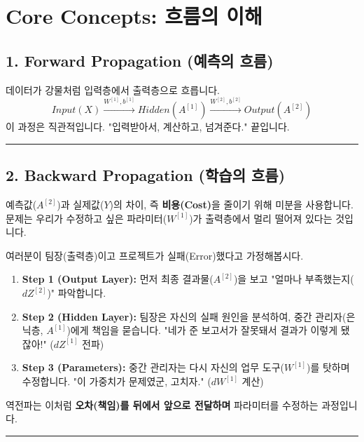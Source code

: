 \documentclass[11pt,a4paper]{book}
\theoremstyle{definition}
\begin{document}
\section{Core Concepts: 흐름의 이해}

\subsection{1. Forward Propagation (예측의 흐름)}


데이터가 강물처럼 입력층에서 출력층으로 흐릅니다.
$$ Input(X) \xrightarrow{W^{[1]}, b^{[1]}} Hidden(A^{[1]}) \xrightarrow{W^{[2]}, b^{[2]}} Output(A^{[2]}) $$
이 과정은 직관적입니다. "입력받아서, 계산하고, 넘겨준다." 끝입니다.

\vspace{0.5cm}\hrule\vspace{0.5cm}

\subsection{2. Backward Propagation (학습의 흐름)}


예측값($A^{[2]}$)과 실제값($Y$)의 차이, 즉 \textbf{비용(Cost)}을 줄이기 위해 미분을 사용합니다.
문제는 우리가 수정하고 싶은 파라미터($W^{[1]}$)가 출력층에서 멀리 떨어져 있다는 것입니다.

\begin{analogybox}[title={프로젝트 실패의 책임 소재 따지기 (The Blame Game)}]
여러분이 팀장(출력층)이고 프로젝트가 실패(Error)했다고 가정해봅시다.
\begin{enumerate}
    \item \textbf{Step 1 (Output Layer):} 먼저 최종 결과물($A^{[2]}$)을 보고 "얼마나 부족했는지($dZ^{[2]}$)" 파악합니다.
    \item \textbf{Step 2 (Hidden Layer):} 팀장은 자신의 실패 원인을 분석하여, 중간 관리자(은닉층, $A^{[1]}$)에게 책임을 묻습니다. "네가 준 보고서가 잘못돼서 결과가 이렇게 됐잖아!" ($dZ^{[1]}$ 전파)
    \item \textbf{Step 3 (Parameters):} 중간 관리자는 다시 자신의 업무 도구($W^{[1]}$)를 탓하며 수정합니다. "이 가중치가 문제였군, 고치자." ($dW^{[1]}$ 계산)
\end{enumerate}
역전파는 이처럼 \textbf{오차(책임)를 뒤에서 앞으로 전달하며} 파라미터를 수정하는 과정입니다.
\end{analogybox}

\vspace{0.5cm}\hrule\vspace{0.5cm}
\end{document}
